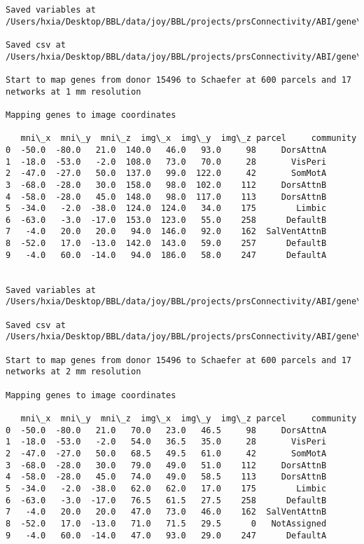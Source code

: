 \documentclass[11pt]{article}
\begin{document}
\begin{Verbatim}[commandchars=\\\{\}]
Saved variables at /Users/hxia/Desktop/BBL/data/joy/BBL/projects/prsConnectivity/ABI/gene\_mapping/15496donor\_600Parcels\_7Network\_2mm.pkl

Saved csv at /Users/hxia/Desktop/BBL/data/joy/BBL/projects/prsConnectivity/ABI/gene\_mapping/15496donor\_600Parcels\_7Network\_2mm.csv

Start to map genes from donor 15496 to Schaefer at 600 parcels and 17 networks at 1 mm resolution

Mapping genes to image coordinates

   mni\_x  mni\_y  mni\_z  img\_x  img\_y  img\_z parcel     community
0  -50.0  -80.0   21.0  140.0   46.0   93.0     98     DorsAttnA
1  -18.0  -53.0   -2.0  108.0   73.0   70.0     28       VisPeri
2  -47.0  -27.0   50.0  137.0   99.0  122.0     42       SomMotA
3  -68.0  -28.0   30.0  158.0   98.0  102.0    112     DorsAttnB
4  -58.0  -28.0   45.0  148.0   98.0  117.0    113     DorsAttnB
5  -34.0   -2.0  -38.0  124.0  124.0   34.0    175        Limbic
6  -63.0   -3.0  -17.0  153.0  123.0   55.0    258      DefaultB
7   -4.0   20.0   20.0   94.0  146.0   92.0    162  SalVentAttnB
8  -52.0   17.0  -13.0  142.0  143.0   59.0    257      DefaultB
9   -4.0   60.0  -14.0   94.0  186.0   58.0    247      DefaultA


Saved variables at /Users/hxia/Desktop/BBL/data/joy/BBL/projects/prsConnectivity/ABI/gene\_mapping/15496donor\_600Parcels\_17Network\_1mm.pkl

Saved csv at /Users/hxia/Desktop/BBL/data/joy/BBL/projects/prsConnectivity/ABI/gene\_mapping/15496donor\_600Parcels\_17Network\_1mm.csv

Start to map genes from donor 15496 to Schaefer at 600 parcels and 17 networks at 2 mm resolution

Mapping genes to image coordinates

   mni\_x  mni\_y  mni\_z  img\_x  img\_y  img\_z parcel     community
0  -50.0  -80.0   21.0   70.0   23.0   46.5     98     DorsAttnA
1  -18.0  -53.0   -2.0   54.0   36.5   35.0     28       VisPeri
2  -47.0  -27.0   50.0   68.5   49.5   61.0     42       SomMotA
3  -68.0  -28.0   30.0   79.0   49.0   51.0    112     DorsAttnB
4  -58.0  -28.0   45.0   74.0   49.0   58.5    113     DorsAttnB
5  -34.0   -2.0  -38.0   62.0   62.0   17.0    175        Limbic
6  -63.0   -3.0  -17.0   76.5   61.5   27.5    258      DefaultB
7   -4.0   20.0   20.0   47.0   73.0   46.0    162  SalVentAttnB
8  -52.0   17.0  -13.0   71.0   71.5   29.5      0   NotAssigned
9   -4.0   60.0  -14.0   47.0   93.0   29.0    247      DefaultA



\end{Verbatim}
\end{document}
